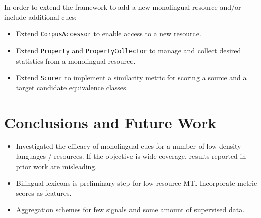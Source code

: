 \documentclass{article}
\begin{document}
In order to extend the framework to add a new monolingual resource and/or include additional cues:

\begin{itemize}
  \item Extend \small{\tt CorpusAccessor} to enable access to a new resource.
  \item Extend \small{\tt Property} and \small{\tt PropertyCollector} to manage and collect desired statistics from a monolingual resource.
  \item Extend \small{\tt Scorer} to implement a similarity metric for scoring a source and a target candidate equivalence classes.
\end{itemize}



\section{Conclusions and Future Work}

\begin{itemize}
  \item Investigated the efficacy of monolingual cues for a number of low-density languages / resources. If the objective is wide coverage, results reported in prior work are misleading.
  \item Bilingual lexicons is preliminary step for low resource MT.  Incorporate metric scores as features.
  \item Aggregation schemes for few signals and some amount of supervised data.
\end{itemize}




 
\end{document}

